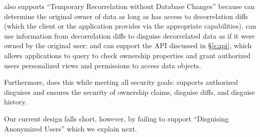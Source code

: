 %
\sys also supports ``Temporary Recorrelation without Database Changes'' because \sys can determine
the original owner of data as long as \sys has access to decorrelation diffs (which the client or
the application provides via the appropriate capabilities).
%
\sys can use information from decorrelation diffs to disguise decorrelated data as if it were owned
by the original user; and 
%
\sys can support the API discussed in \S\ref{s:api}, which allows applications to query \sys to
check ownership properties and grant authorized users personalized views and permissions to access
data objects.

Furthermore, \sys does this while meeting all security goals: \sys supports authorized disguises and
ensures the security of ownership claims, disguise diffs, and disguise history.

Our current design falls short, however, by failing to support ``Disguising Anonymized
Users'' which we explain next.
\fi
